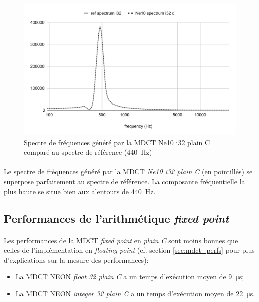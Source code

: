 \documentclass{article}
\begin{document}
    \begin{figure}[H]
        \centering
        \includegraphics[width=.8\linewidth]{./images/validation_ne10_i32_c.pdf}
        \caption{Spectre de fréquences généré par la MDCT Ne10 i32 plain C comparé au spectre de référence (\SI{440}{\hertz})}
        \label{fig:validation_ne10_i32_c}
    \end{figure}

    \paragraph{}
    Le spectre de fréquences généré par la MDCT \emph{Ne10 i32 plain C} (en pointillés) se superpose parfaitement au spectre de référence. La composante fréquentielle la plus haute se situe bien aux alentours de \SI{440}{\hertz}.



    \subsection{Performances de l'arithmétique \emph{fixed point}}
    \label{sec:fixed_point_perfs}
    \paragraph{}
    Les performances de la MDCT \emph{fixed point} en \emph{plain C} sont moins bonnes que celles de l'implémentation en \emph{floating point} (cf. section \ref{sec:mdct_perfs} pour plus d'explications sur la mesure des performances):
    \begin{itemize}
        \item La MDCT NEON \emph{float 32 plain C} a un temps d'exécution moyen de \SI{9}{\micro\second};
        \item La MDCT NEON \emph{integer 32 plain C} a un temps d'exécution moyen de \SI{22}{\micro\second}.
    \end{itemize}
\end{document}
